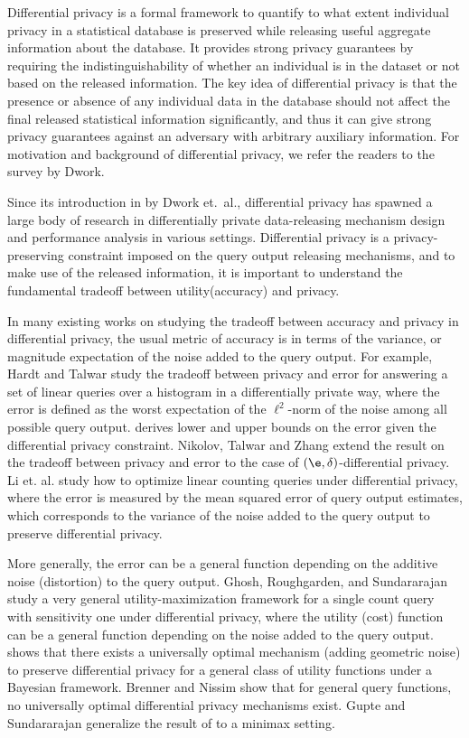 
Differential privacy is a  formal framework to quantify to what extent individual privacy in a statistical database is preserved while releasing useful aggregate information about the database.
It provides strong privacy guarantees by requiring the indistinguishability of whether an individual is in the dataset or not based on the released information. The key idea of differential privacy is that the presence or absence
of any individual data in the database should not affect the final released statistical information significantly, and thus it can give strong privacy guarantees against an adversary with arbitrary auxiliary information. For motivation and background of differential privacy, we refer the readers to the  survey \cite{DPsurvey} by Dwork.

Since its introduction in \cite{DMNS06} by Dwork et.\ al., differential privacy has spawned  a large body of research in  differentially private data-releasing mechanism design and performance analysis in various settings. Differential privacy is a privacy-preserving constraint imposed on the query output releasing mechanisms, and to make use of the released information, it is important to understand the fundamental tradeoff between utility(accuracy) and privacy.



In many existing works on studying the tradeoff between accuracy and privacy in differential privacy, the usual metric of accuracy is in terms of the variance, or magnitude expectation of the noise added to the query output.  For example, Hardt and Talwar \cite{geometry} study the tradeoff between privacy and error for answering a set of linear queries over a histogram in a differentially private way, where the error is defined as the worst  expectation of the $\ell^2$-norm of the noise among all possible query output.  \cite{geometry} derives lower and upper bounds on the error given the differential privacy constraint. Nikolov, Talwar and Zhang \cite{NTZ12} extend the result on the tradeoff between privacy and error to the case of  $(\e,\delta)$-differential privacy. Li et. al. \cite{Li10} study how to optimize linear counting queries under differential privacy, where the error is measured by the mean squared error of query output estimates, which corresponds to the variance of the noise added to the query output to preserve differential privacy.

More generally, the error can be a general function depending on the additive noise (distortion) to the query output.  Ghosh, Roughgarden,  and Sundararajan \cite{Ghosh09}  study a very general utility-maximization framework for a single count query with sensitivity one under differential privacy, where the utility (cost) function can be a general function depending on the noise added to the query output. \cite{Ghosh09} shows that there exists a universally optimal mechanism (adding geometric noise) to preserve differential privacy for a general class of utility functions under a Bayesian framework.  Brenner and Nissim \cite{Nissim10} show that for general query functions, no universally optimal differential privacy mechanisms exist. Gupte and Sundararajan  \cite{minimax10} generalize the result of \cite{Ghosh09}  to a minimax setting.


